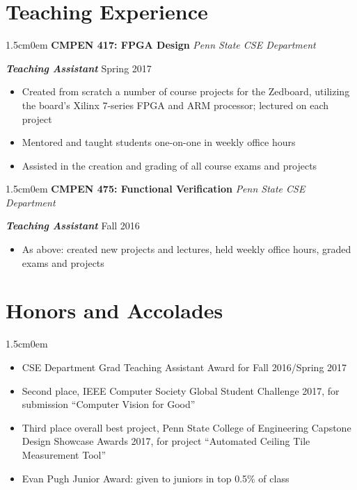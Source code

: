 \documentclass[letterpaper]{article}
\newcommand{\primaryindent}{1.5cm} %
\newenvironment{indented}{\begin{adjustwidth}{\primaryindent}{0em}}{\end{adjustwidth}}
\newenvironment{resumelist}{\begin{itemize}[topsep=0pt,noitemsep,itemindent=-15pt,leftmargin=30pt]}{\end{itemize}}
\newcommand{\generalentry}[5]{
	\begin{indented}
		\Large \textsf{\textbf{#1}} \hfill	%
			\hfill\normalsize\textit{#2} \par  			%
		\noindent \large \textsf{\textbf{\textit{#3}}} 	%
			\hfill \normalsize #4\par 					%
		\normalsize \normalfont #5 \par					%
		\normalsize \normalfont
	\end{indented}
	}
\begin{document}
\section*{Teaching Experience}

\generalentry{CMPEN 417: FPGA Design}{Penn State CSE Department}{Teaching Assistant}{Spring 2017}{
	\begin{resumelist}
		\item Created from scratch a number of course projects for the Zedboard, utilizing the board's Xilinx 7-series FPGA and ARM processor; lectured on each project
		\item Mentored and taught students one-on-one in weekly office hours
		\item Assisted in the creation and grading of all course exams and projects
	\end{resumelist}
}

\vspace{3mm}

\generalentry{CMPEN 475: Functional Verification}{Penn State CSE Department}{Teaching Assistant}{Fall 2016}{
	\begin{resumelist}
		\item As above: created new projects and lectures, held weekly office hours, graded exams and projects
	\end{resumelist}
}

\section*{Honors and Accolades}
\begin{indented}
	\begin{resumelist}
	\item CSE Department Grad Teaching Assistant Award for Fall 2016/Spring 2017
	\item Second place, IEEE Computer Society Global Student Challenge 2017, for submission ``Computer Vision for Good''	
	\item Third place overall best project, Penn State College of Engineering Capstone Design Showcase Awards 2017, for project ``Automated Ceiling Tile Measurement Tool''
	\item Evan Pugh Junior Award: given to juniors in top 0.5\% of class
	\end{resumelist}
\end{indented}

\nocite{*}

\renewcommand{\refname}{Publications}

\end{document}
